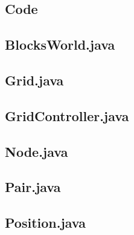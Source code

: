 \documentclass[a4paper]{article}
\begin{document}

\newpage
\begin{appendices}
  \addappheadtotoc

  \section{Code}
  \label{app:code}
  \subsection{BlocksWorld.java}
  \label{app:code-BlocksWorld}
  

  \newpage
  \subsection{Grid.java}
  \label{app:code-Grid}
  

  \newpage
  \subsection{GridController.java}
  \label{app:code-GridController}
  

  \newpage
  \subsection{Node.java}
  \label{app:code-Node}
  

  \newpage
  \subsection{Pair.java}
  \label{app:code-Pair}
  

  \newpage
  \subsection{Position.java}
  \label{app:code-Position}
  


\end{appendices}
\end{document}
